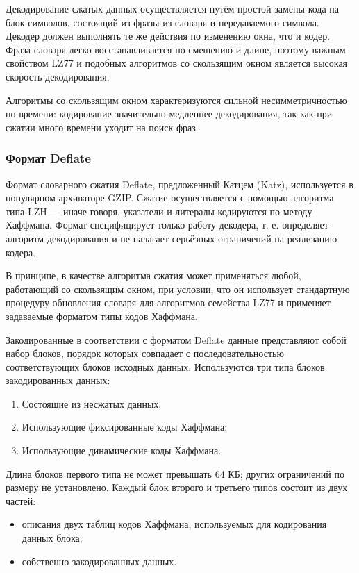 \documentclass[12pt]{article}
\begin{document}
Декодирование сжатых данных осуществляется путём простой
замены кода на блок символов, состоящий из фразы из словаря и передаваемого символа.
Декодер должен выполнять те же действия по изменению окна, что и кодер.
Фраза словаря легко восстанавливается по смещению и длине,
поэтому важным свойством LZ77 и подобных алгоритмов со скользящим окном является
высокая скорость декодирования.

Алгоритмы со скользящим окном характеризуются сильной несимметричностью по времени:
кодирование значительно медленнее декодирования,
так как при сжатии много времени уходит на поиск фраз.

\subsubsection{Формат Deflate}

Формат словарного сжатия Deflate, предложенный Катцем (Katz),
используется в популярном архиваторе GZIP.
Сжатие осуществляется с помощью алгоритма типа LZH —
иначе говоря, указатели и литералы кодируются по методу Хаффмана.
Формат специфицирует только работу декодера, т. е. определяет алгоритм декодирования
и не налагает серьёзных ограничений на реализацию кодера.

В принципе, в качестве алгоритма сжатия может применяться любой, работающий со скользящим окном,
при условии, что он использует стандартную процедуру обновления словаря для алгоритмов семейства LZ77
и применяет задаваемые форматом типы кодов Хаффмана.

Закодированные в соответствии с форматом Deflate данные представляют собой набор блоков,
порядок которых совпадает с последовательностью соответствующих блоков исходных данных.
Используются три типа блоков закодированных данных:

\begin{enumerate}
\item Состоящие из несжатых данных;
\item Использующие фиксированные коды Хаффмана;
\item Использующие динамические коды Хаффмана.
\end{enumerate}

Длина блоков первого типа не может превышать 64 КБ; других ограничений по размеру не установлено.
Каждый блок второго и третьего типов состоит из двух частей:

\begin{itemize}[label=-]
\item описания двух таблиц кодов Хаффмана, используемых для кодирования данных блока;
\item собственно закодированных данных.
\end{itemize}
\end{document}
